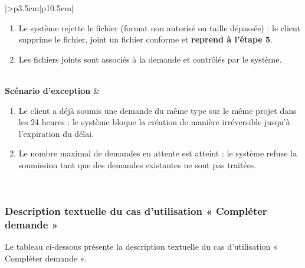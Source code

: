 \begin{longtable}{|>{}p{3.5cm}|p{10.5cm}|}
\begin{minipage}[t]{\linewidth}
\begin{enumerate}[label=A\arabic*.,nosep,leftmargin=0.6cm,topsep=0pt,itemsep=1pt]
\item Le système rejette le fichier (format non autorisé ou taille dépassée) : le client supprime le fichier, joint un fichier conforme et \textbf{reprend à l'étape 5}.
\item Les fichiers joints sont associés à la demande et contrôlés par le système.
\end{enumerate}
\end{minipage} \\
\hline
\textbf{Scénario d'exception} &
\begin{minipage}[t]{\linewidth}\raggedright
\begin{enumerate}[label=E\arabic*.,nosep,leftmargin=0.6cm,topsep=0pt,itemsep=1pt]
\item  Le client a déjà soumis une demande du même type sur le même projet dans les 24 heures : le système bloque la création de manière irréversible jusqu'à l'expiration du délai.
\item Le nombre maximal de demandes en attente est atteint : le système refuse la soumission tant que des demandes existantes ne sont pas traitées.
\end{enumerate}
\end{minipage} \\
\hline
\end{longtable}
\normalsize

\subsubsection{Description textuelle du cas d’utilisation « Compléter demande »}
Le tableau ci-dessous présente la description textuelle du cas d’utilisation « Compléter demande ».

